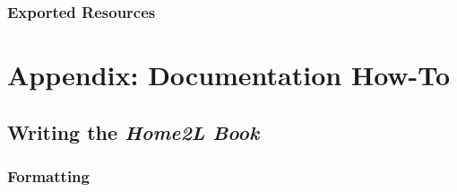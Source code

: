 \documentclass[12pt,english,parskip=half,headheight=19pt]{scrreprt}
\begin{document}
\subsection{Exported Resources}
\label{sec:drvlib-weather-rc}








\appendix





%
\chapter{Appendix: Documentation How-To}
%



\section{Writing the \textit{Home2L Book}}
\label{sec:documenting-the_book}


\subsection{Formatting}
\end{document}
